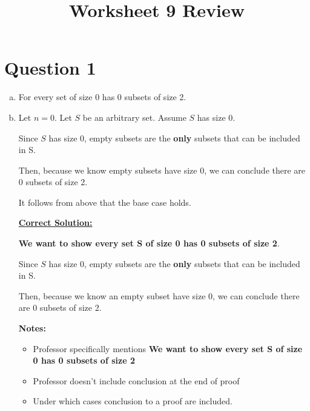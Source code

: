 \documentclass[12pt]{article}
\begin{document}
\title{Worksheet 9 Review}
\maketitle

\section*{Question 1}
\begin{enumerate}[a.]
    \item

    For every set of size 0 has 0 subsets of size 2.

    \item

    Let $n = 0$. Let $S$ be an arbitrary set. Assume $S$ has size 0.

    \bigskip

    Since $S$ has size 0, empty subsets are the \textbf{only} subsets that can be included
    in S.

    \bigskip

    Then, because we know empty subsets have size 0, we can conclude there are 0
    subsets of size 2.

    \bigskip

    It follows from above that the base case holds.


    \begin{mdframed}
        \underline{\textbf{Correct Solution:}}

        \color{red}
        \textbf{We want to show every set S of size 0 has 0 subsets of size 2}.
        \color{black}

        \bigskip

        Since $S$ has size 0, empty subsets are the \textbf{only} subsets that can be included
        in S.

        \bigskip

        Then, because we know an empty subset have size 0, we can conclude there are 0
        subsets of size 2.

    \end{mdframed}

    \textbf{Notes:}
    \begin{itemize}
        \item Professor specifically mentions \textbf{We want to show every set
        S of size 0 has 0 subsets of size 2}
        \item Professor doesn't include conclusion at the end of proof
        \item Under which cases conclusion to a proof are included.
    \end{itemize}


\end{enumerate}
\end{document}
